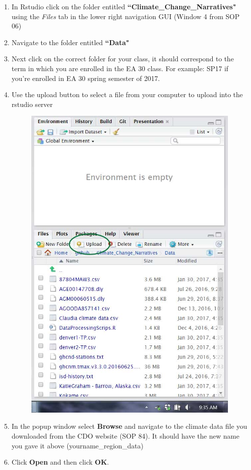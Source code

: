 \documentclass{article}\usepackage[]{graphicx}\usepackage[]{color}
\begin{document}
  \begin{enumerate}
  \item In Rstudio click on the folder entitled \textbf{``Climate\_Change\_Narratives"} using the \textit{Files} tab in the lower right navigation GUI (Window 4 from SOP 06)
  \item Navigate to the folder entitled \textbf{``Data"} 
  \item Next click on the correct folder for your class, it should correspond to the term in which you are enrolled in the EA 30 class. For example: SP17 if you're enrolled in EA 30 spring semester of 2017.
  \item Use the upload button to select a file from your computer to upload into the rstudio server
  \begin{figure}[h]
  \includegraphics[scale=0.25]{"Upload_button"}
  \end{figure}
  \item In the popup window select \textbf{Browse} and navigate to the climate data file you downloaded from the CDO website (SOP 84). It should have the new name you gave it above (yourname\_region\_data)
  \item Click \textbf{Open} and then click \textbf{OK}. 
  
  \end{enumerate}
\end{document}

